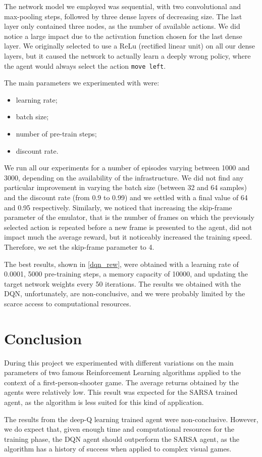 \documentclass[letterpaper]{article} %
\begin{document}
The network model we employed was sequential, with two convolutional and max-pooling steps, followed by three dense layers of decreasing size. The last layer only contained three nodes, as the number of available actions. We did notice a large impact due to the activation function chosen for the last dense layer. We originally selected to use a ReLu (rectified linear unit) on all our dense layers, but it caused the network to actually learn a deeply wrong policy, where the agent would always select the action \verb|move left|.

The main parameters we experimented with were:
\begin{itemize}
    \item learning rate;
    \item batch size;
    \item number of pre-train steps;
    \item discount rate.
\end{itemize}

We run all our experiments for a number of episodes varying between 1000 and 3000, depending on the availability of the infrastructure.
We did not find any particular improvement in varying the batch size (between 32 and 64 samples) and the discount rate (from 0.9 to 0.99) and we settled with a final value of 64 and 0.95 respectively. Similarly, we noticed that increasing the skip-frame parameter of the emulator, that is the number of frames on which the previously selected action is repeated before a new frame is presented to the agent, did not impact much the average reward, but it noticeably increased the training speed. Therefore, we set the skip-frame parameter to 4.

The best results, shown in \cref{dqn_rew}, were obtained with a learning rate of 0.0001, 5000 pre-training steps, a memory capacity of 10000, and updating the target network weights every 50 iterations. The results we obtained with the DQN, unfortunately, are non-conclusive, and we were probably limited by the scarce access to computational resources.



\section{Conclusion}
During this project we experimented with different variations on the main parameters of two famous Reinforcement Learning algorithms applied to the context of a first-person-shooter game. The average returns obtained by the agents were relatively low. This result was expected for the SARSA trained agent, as the algorithm is less suited for this kind of application.

The results from the deep-Q learning trained agent were non-conclusive. However, we do expect that, given enough time and computational resources for the training phase, the DQN agent should outperform the SARSA agent, as the algorithm has a history of success when applied to complex visual games. 

\medskip
\printbibliography
\end{document}
